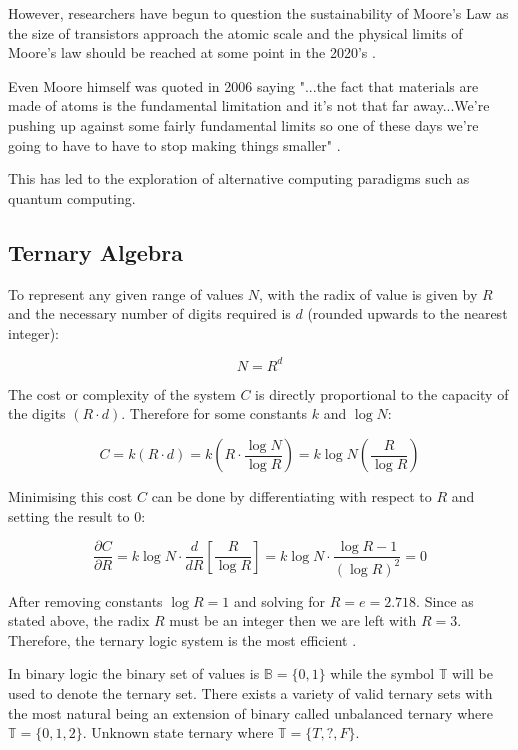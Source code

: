 \documentclass{article}
\begin{document}
However, researchers have begun to question the sustainability of Moore's Law as the size of transistors approach the
atomic scale and the physical limits of Moore's law should be reached at some point in the 2020's
\citep{zhou2020quantum}.

Even Moore himself was quoted in 2006 saying "...the fact that materials are made of atoms is the fundamental limitation
and it's not that far away...We're pushing up against some fairly fundamental limits so one of these days we're going to 
have to have to stop making things smaller"
\citep{moore2006interview}.

This has led to the exploration of alternative computing paradigms such as quantum computing.

\subsection{Ternary Algebra}

To represent any given range of values $N$, with the radix of value is given by $R$ and the necessary number of digits 
required is $d$ (rounded upwards to the nearest integer):

\begin{equation}
  N = R^{d}
\end{equation}

The cost or complexity of the system $C$ is directly proportional to the capacity of the digits $(R \cdot d)$.
Therefore for some constants $k$ and $\log N$:
\citep{hurst1984mvl}

\begin{equation}
  C = k(R \cdot d) = k(R \cdot \frac{\log N}{\log R}) = k \log N (\frac{R}{\log R})
\end{equation}

Minimising this cost $C$ can be done by differentiating with respect to $R$ and setting the result to $0$:

\begin{equation}
  \frac{\partial C}{\partial R} = 
  k\log N\cdot\frac{d}{dR}\left[\frac{R}{\log R}\right] = 
  k\log N\cdot \frac{\log R -1}{(\log R)^2} = 0
\end{equation}

After removing constants $\log R = 1$ and solving for $R = e = 2.718$. Since as stated above, the radix $R$ must be an 
integer then we are left with $R = 3$. Therefore, the ternary logic system is the most efficient \citep{jaber2020mvl}.

In binary logic the binary set of values is $\mathbb{B} = \{0, 1\}$ while the symbol $\mathbb{T}$ will be used to denote 
the ternary set. There exists a variety of valid ternary sets with the most natural being an extension of binary called
unbalanced ternary where $\mathbb{T} = \{0, 1, 2\}$. Unknown state ternary where $\mathbb{T} = \{T, ?, F\}$.
\end{document}
